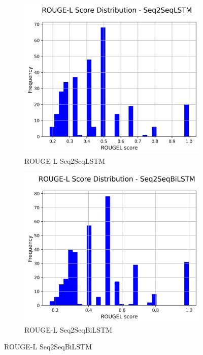 \begin{figure}[H]
    \begin{subfigure}{0.24\textwidth}
        \centering
        \includegraphics[width=\textwidth]{media/Seq2SeqLSTM_rougeL_scores.png}
        \caption{ROUGE-L Seq2SeqLSTM}
    \end{subfigure}
    \hfill
    \begin{subfigure}{0.24\textwidth}
        \centering
        \includegraphics[width=\textwidth]{media/Seq2SeqBiLSTM_rougeL_scores.png}
        \caption{ROUGE-L Seq2SeqBiLSTM}

\end{subfigure}
\end{figure}
